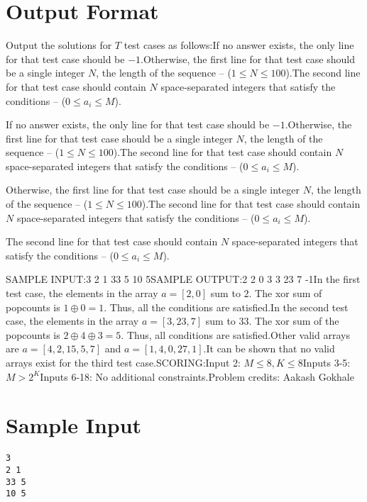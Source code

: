 \documentclass[12pt]{article}
\begin{document}
\section*{Output Format}
Output the solutions for $T$ test cases as follows:If no answer exists, the only line for that test case should be $-1$.Otherwise, the first line for that test case should be a single integer $N$, the
length of the sequence -- ($1 \le  N \le 100$).The second line for that test case should contain $N$ space-separated integers
that satisfy the conditions -- ($0 \le a_i \le M$).

If no answer exists, the only line for that test case should be $-1$.Otherwise, the first line for that test case should be a single integer $N$, the
length of the sequence -- ($1 \le  N \le 100$).The second line for that test case should contain $N$ space-separated integers
that satisfy the conditions -- ($0 \le a_i \le M$).

Otherwise, the first line for that test case should be a single integer $N$, the
length of the sequence -- ($1 \le  N \le 100$).The second line for that test case should contain $N$ space-separated integers
that satisfy the conditions -- ($0 \le a_i \le M$).

The second line for that test case should contain $N$ space-separated integers
that satisfy the conditions -- ($0 \le a_i \le M$).

SAMPLE INPUT:3
2 1
33 5
10 5SAMPLE OUTPUT:2
2 0
3
3 23 7 
-1In the first test case, the elements in the array $a = [2, 0]$ sum to $2$. The
xor sum of popcounts is $1 \oplus 0 = 1$. Thus, all the conditions are
satisfied.In the second test case, the elements in the array $a = [3, 23, 7]$ sum to $33$.
The xor sum of the popcounts is $2 \oplus 4 \oplus 3 = 5$. Thus, all conditions
are satisfied.Other valid arrays are $a = [4, 2, 15, 5, 7]$ and $a = [1, 4, 0, 27, 1]$.It can be shown that no valid arrays exist for the third test case.SCORING:Input 2: $M \leq 8, K \leq 8$Inputs 3-5: $M > 2^K$Inputs 6-18: No additional constraints.Problem credits: Aakash Gokhale

\section*{Sample Input}
\begin{verbatim}
3
2 1
33 5
10 5
\end{verbatim}
\end{document}
